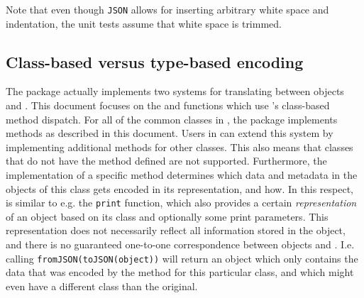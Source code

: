 \begin{knitrout}\mycodesize
{}\color{fgcolor}\begin{kframe}
\begin{alltt}
\hlstd{(}\hlstd{)}
\end{alltt}
\end{kframe}
\end{knitrout}


Note that even though \texttt{JSON} allows for inserting arbitrary white space and indentation, the unit tests assume that white space is trimmed.

\subsection{Class-based versus type-based encoding}
\label{serializejson}

The \jsonlite package actually implements two systems for translating between \R objects and \JSON. This document focuses on the \toJSON and \fromJSON functions which use \R's class-based method dispatch. For all of the common classes in \R, the \jsonlite package implements \toJSON methods as described in this document. Users in \R can extend this system by implementing additional methods for other classes. This also means that classes that do not have the \toJSON method defined are not supported. Furthermore, the implementation of a specific \toJSON method determines which data and metadata in the objects of this class gets encoded in its \JSON representation, and how. In this respect, \toJSON is similar to e.g. the \texttt{print} function, which also provides a certain \emph{representation} of an object based on its class and optionally some print parameters. This representation does not necessarily reflect all information stored in the object, and there is no guaranteed one-to-one correspondence between \R objects and \JSON. I.e. calling \texttt{fromJSON(toJSON(object))} will return an object which only contains the data that was encoded by the \toJSON method for this particular class, and which might even have a different class than the original.

